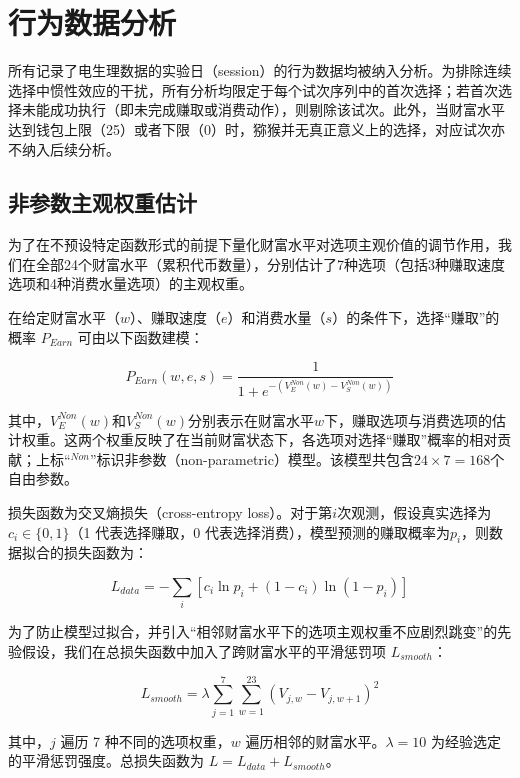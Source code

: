 \section{行为数据分析}\label{chap2:methods_BHV}
所有记录了电生理数据的实验日（session）的行为数据均被纳入分析。为排除连续选择中惯性效应的干扰，所有分析均限定于每个试次序列中的首次选择；若首次选择未能成功执行（即未完成赚取或消费动作），则剔除该试次。此外，当财富水平达到钱包上限（25）或者下限（0）时，猕猴并无真正意义上的选择，对应试次亦不纳入后续分析。

\subsection{非参数主观权重估计}\label{chap2:methods_BHV_nonparametric}
为了在不预设特定函数形式的前提下量化财富水平对选项主观价值的调节作用，我们在全部24个财富水平（累积代币数量），分别估计了7种选项（包括3种赚取速度选项和4种消费水量选项）的主观权重。

在给定财富水平（$w$）、赚取速度（$e$）和消费水量（$s$）的条件下，选择“赚取”的概率 $P_{Earn}$ 可由以下函数建模：

\begin{equation}
    P_{Earn}(w,e,s) = \frac{1}{1 + e^{-\left(V^{Non}_E(w) - V^{Non}_S(w)\right)}}
\end{equation}

其中，$V^{Non}_E(w)$和$V^{Non}_S(w)$分别表示在财富水平$w$下，赚取选项与消费选项的估计权重。这两个权重反映了在当前财富状态下，各选项对选择“赚取”概率的相对贡献；上标“$^{Non}$”标识非参数（non-parametric）模型。该模型共包含$24 \times 7 = 168$个自由参数。

损失函数为交叉熵损失（cross-entropy loss）。对于第$i$次观测，假设真实选择为$c_i \in \{0, 1\}$（1 代表选择赚取，0 代表选择消费），模型预测的赚取概率为$p_i$，则数据拟合的损失函数为：

\begin{equation}\label{eq:cross_entropy}
    L_{data} = -\sum_{i} \left[c_i \ln p_i + (1-c_i) \ln (1-p_i)\right]
\end{equation}

为了防止模型过拟合，并引入“相邻财富水平下的选项主观权重不应剧烈跳变”的先验假设，我们在总损失函数中加入了跨财富水平的平滑惩罚项 $L_{smooth}$：

\begin{equation}
    L_{smooth} = \lambda \sum_{j=1}^{7} \sum_{w=1}^{23} (V_{j,w} - V_{j,w+1})^2
\end{equation}

其中，$j$ 遍历 7 种不同的选项权重，$w$ 遍历相邻的财富水平。$\lambda = 10$ 为经验选定的平滑惩罚强度。总损失函数为 $L = L_{data} + L_{smooth}$。

